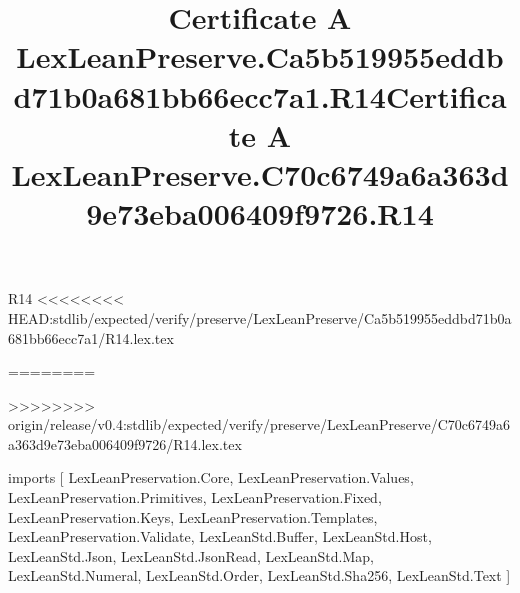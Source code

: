 \begin{lexlean}{R14}
<<<<<<<< HEAD:stdlib/expected/verify/preserve/LexLeanPreserve/Ca5b519955eddbd71b0a681bb66ecc7a1/R14.lex.tex
\title{Certificate A LexLeanPreserve.Ca5b519955eddbd71b0a681bb66ecc7a1.R14}
========
\title{Certificate A LexLeanPreserve.C70c6749a6a363d9e73eba006409f9726.R14}
>>>>>>>> origin/release/v0.4:stdlib/expected/verify/preserve/LexLeanPreserve/C70c6749a6a363d9e73eba006409f9726/R14.lex.tex
\begin{coremodule}
imports [
  LexLeanPreservation.Core,
  LexLeanPreservation.Values,
  LexLeanPreservation.Primitives,
  LexLeanPreservation.Fixed,
  LexLeanPreservation.Keys,
  LexLeanPreservation.Templates,
  LexLeanPreservation.Validate,
  LexLeanStd.Buffer,
  LexLeanStd.Host,
  LexLeanStd.Json,
  LexLeanStd.JsonRead,
  LexLeanStd.Map,
  LexLeanStd.Numeral,
  LexLeanStd.Order,
  LexLeanStd.Sha256,
  LexLeanStd.Text
]


\end{coremodule}
\end{lexlean}
